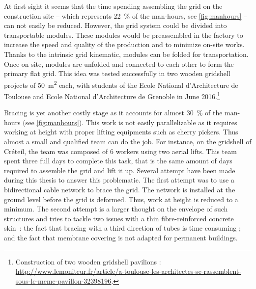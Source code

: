 At first sight it seems that the time spending assembling the grid on the construction site -- which represents 22~\% of the man-hours, see \cref{fig:manhours} -- can not easily be reduced. However, the grid system could be divided into transportable modules. These modules would be preassembled in the factory to increase the speed and quality of the production and to minimize on-site works. Thanks to the intrinsic grid kinematic, modules can be folded for transportation. Once on site, modules are unfolded and connected to each other to form the primary flat grid. This idea was tested successfully in two wooden gridshell projects of 50~m\textsuperscript{2} each, with students of the Ecole National d'Architecture de Toulouse and Ecole National d'Architecture de Grenoble in June 2016.\footnote{Construction of two wooden gridshell pavilions : \url{http://www.lemoniteur.fr/article/a-toulouse-les-architectes-se-rassemblent-sous-le-meme-pavillon-32398196}.}

Bracing is yet another costly stage as it accounts for almost 30~\% of the man-hours (see \cref{fig:manhours}). This work is not easily parallelizable as it requires working at height with proper lifting equipments such as cherry pickers. Thus almost a small and qualified team can do the job. For instance, on the gridshell of Créteil, the team was composed of 6 workers using two aerial lifts. This team spent three full days to complete this task, that is the same amount of days required to assemble the grid and lift it up. Several attempt have been made during this thesis to answer this problematic. The first attempt was to use a bidirectional cable network to brace the grid. The network is installed at the ground level before the grid is deformed. Thus, work at height is reduced to a minimum. The second attempt is a larger thought on the envelope of such structures and tries to tackle two issues with a thin fibre-reinforced concrete skin~: the fact that bracing with a third direction of tubes is time consuming ; and the fact that membrane covering is not adapted for permanent buildings.

\clearpage


